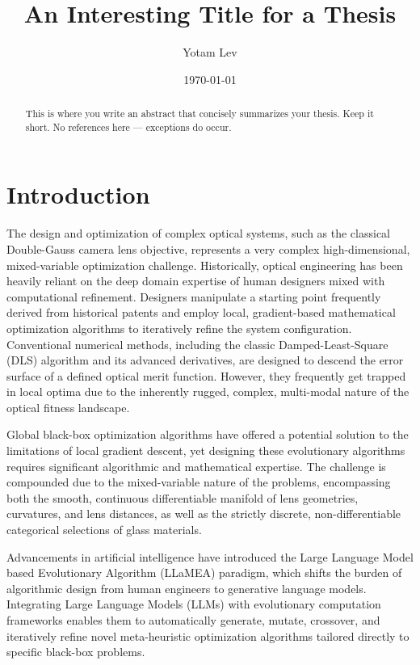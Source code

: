 \documentclass[12pt]{article}
\title{An Interesting Title for a Thesis}
\author{Yotam Lev}
\date{\today}
\begin{document}
\maketitle


\thispagestyle{empty}
\begin{abstract}
\noindent
This is where you write an abstract that concisely summarizes your thesis.
Keep it short. No references here --- exceptions do occur.
\end{abstract}

\newpage

\thispagestyle{empty}
\tableofcontents
\thispagestyle{empty}
\clearpage
\setcounter{page}{1}

\section{Introduction} \label{introduction}

The design and optimization of complex optical systems, such as the classical Double-Gauss camera lens objective, represents a very complex high-dimensional, mixed-variable optimization challenge. Historically, optical engineering has been heavily reliant on the deep domain expertise of human designers mixed with computational refinement. Designers manipulate a starting point frequently derived from historical patents and employ local, gradient-based mathematical optimization algorithms to iteratively refine the system configuration. Conventional numerical methods, including the classic Damped-Least-Square (DLS) algorithm and its advanced derivatives, are designed to descend the error surface of a defined optical merit function. However, they frequently get trapped in local optima due to the inherently rugged, complex, multi-modal nature of the optical fitness landscape.

Global black-box optimization algorithms have offered a potential solution to the limitations of local gradient descent, yet designing these evolutionary algorithms requires significant algorithmic and mathematical expertise. The challenge is compounded due to the mixed-variable nature of the problems, encompassing both the smooth, continuous differentiable manifold of lens geometries, curvatures, and lens distances, as well as the strictly discrete, non-differentiable categorical selections of glass materials.

Advancements in artificial intelligence have introduced the Large Language Model based Evolutionary Algorithm (LLaMEA) paradigm, which shifts the burden of algorithmic design from human engineers to generative language models. Integrating Large Language Models (LLMs) with evolutionary computation frameworks enables them to automatically generate, mutate, crossover, and iteratively refine novel meta-heuristic optimization algorithms tailored directly to specific black-box problems. 
\end{document}
